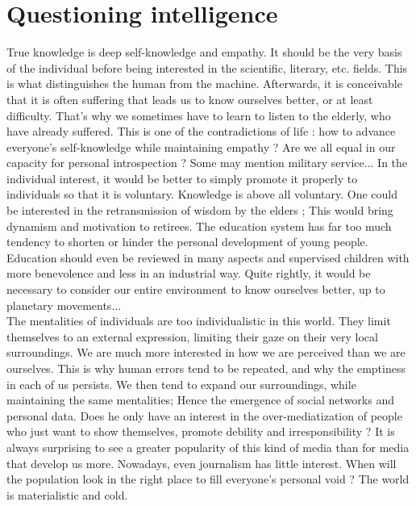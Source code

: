 \chapter*{Questioning intelligence}

True knowledge is deep self-knowledge and empathy. It should be the very basis of the individual before being interested in the scientific, literary, etc. fields. This is what distinguishes the human from the machine. Afterwards, it is conceivable that it is often suffering that leads us to know ourselves better, or at least difficulty. That's why we sometimes have to learn to listen to the elderly, who have already suffered. This is one of the contradictions of life : how to advance everyone's self-knowledge while maintaining empathy ? Are we all equal in our capacity for personal introspection ? Some may mention military service... In the individual interest, it would be better to simply promote it properly to individuals so that it is voluntary. Knowledge is above all voluntary. One could be interested in the retransmission of wisdom by the elders ; This would bring dynamism and motivation to retirees. The education system has far too much tendency to shorten or hinder the personal development of young people. Education should even be reviewed in many aspects and supervised children with more benevolence and less in an industrial way. Quite rightly, it would be necessary to consider our entire environment to know ourselves better, up to planetary movements...\\

The mentalities of individuals are too individualistic in this world. They limit themselves to an external expression, limiting their gaze on their very local surroundings. We are much more interested in how we are perceived than we are ourselves. This is why human errors tend to be repeated, and why the emptiness in each of us persists. We then tend to expand our surroundings, while maintaining the same mentalities; Hence the emergence of social networks and personal data. Does he only have an interest in the over-mediatization of people who just want to show themselves, promote debility and irresponsibility ? It is always surprising to see a greater popularity of this kind of media than for media that develop us more. Nowadays, even journalism has little interest. When will the population look in the right place to fill everyone's personal void ? The world is materialistic and cold.\\

